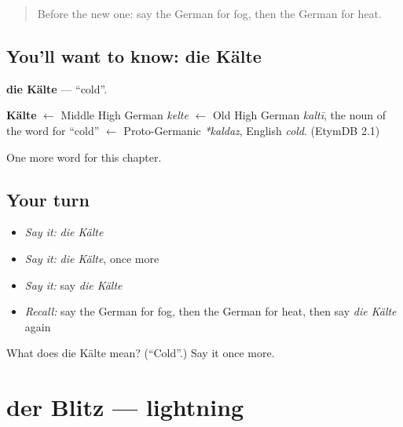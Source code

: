\label{lesson:GE-C197-kaelte}



\begin{quote}
Before the new one: say the German for fog, then the German for heat.
\end{quote}

\subsection*{You'll want to know: die Kälte}
\textbf{die Kälte} — \textquotedblleft{}cold\textquotedblright{}.

\begin{cousinweb}
\textbf{Kälte} $\leftarrow$ Middle High German \emph{kelte} $\leftarrow$ Old High German \emph{kaltī}, the noun of the word for \textquotedblleft{}cold\textquotedblright{} $\leftarrow$ Proto-Germanic \emph{*kaldaz}, English \emph{cold}. (EtymDB 2.1)
\end{cousinweb}

\begin{grammarlens}[title={What you've built}]
One more word for this chapter.
\end{grammarlens}

\subsection*{Your turn}
\begin{itemize}
\raggedright
  \item \emph{Say it:} \emph{die Kälte}
  \item \emph{Say it:} \emph{die Kälte}, once more
  \item \emph{Say it:} say \emph{die Kälte}
  \item \emph{Recall:} say the German for fog, then the German for heat, then say \emph{die Kälte} again
\end{itemize}

\begin{tcolorbox}[breakable,colback=teal!4,colframe=teal!35!black,title={Before you move on}]
What does die Kälte mean? (\textquotedblleft{}Cold\textquotedblright{}.) Say it once more.
\end{tcolorbox}
\section[der Blitz]{der Blitz — lightning}

\label{lesson:GE-C197-blitz}



